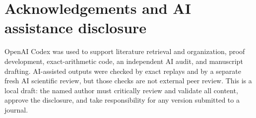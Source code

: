\documentclass[11pt,a4paper]{article}
\theoremstyle{definition}
\theoremstyle{remark}
\begin{document}
\section*{Acknowledgements and AI assistance disclosure}

OpenAI Codex was used to support literature retrieval and organization, proof
development, exact-arithmetic code, an independent AI audit, and manuscript drafting.
AI-assisted outputs were checked by exact replays and by a separate fresh AI scientific
review, but those checks are not external peer review.  This is a local draft: the named
author must critically review and validate all content, approve the disclosure, and take
responsibility for any version submitted to a journal.



\end{document}
